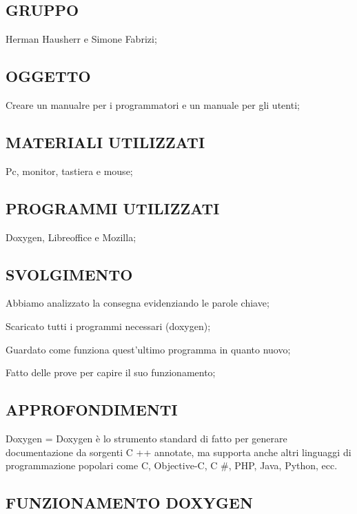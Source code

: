 \subsection*{G\+R\+U\+P\+PO}

Herman Hausherr e Simone Fabrizi; \subsection*{O\+G\+G\+E\+T\+TO}

Creare un manualre per i programmatori e un manuale per gli utenti; \subsection*{M\+A\+T\+E\+R\+I\+A\+LI U\+T\+I\+L\+I\+Z\+Z\+A\+TI}

Pc, monitor, tastiera e mouse; \subsection*{P\+R\+O\+G\+R\+A\+M\+MI U\+T\+I\+L\+I\+Z\+Z\+A\+TI}

Doxygen, Libreoffice e Mozilla; \subsection*{S\+V\+O\+L\+G\+I\+M\+E\+N\+TO}


\begin{DoxyEnumerate}
\item Abbiamo analizzato la consegna evidenziando le parole chiave;
\item Scaricato tutti i programmi necessari (doxygen);
\item Guardato come funziona quest’ultimo programma in quanto nuovo;
\item Fatto delle prove per capire il suo funzionamento; \subsection*{A\+P\+P\+R\+O\+F\+O\+N\+D\+I\+M\+E\+N\+TI}
\end{DoxyEnumerate}

Doxygen = Doxygen è lo strumento standard di fatto per generare documentazione da sorgenti C ++ annotate, ma supporta anche altri linguaggi di programmazione popolari come C, Objective-\/C, C \#, P\+HP, Java, Python, ecc. \subsection*{F\+U\+N\+Z\+I\+O\+N\+A\+M\+E\+N\+TO D\+O\+X\+Y\+G\+EN}


